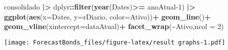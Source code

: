 \documentclass[
]{article}
\newenvironment{Shaded}{\begin{snugshade}}{\end{snugshade}}
\newcommand{\AttributeTok}[1]{\textcolor[rgb]{0.13,0.29,0.53}{#1}}
\newcommand{\DecValTok}[1]{\textcolor[rgb]{0.00,0.00,0.81}{#1}}
\newcommand{\FunctionTok}[1]{\textcolor[rgb]{0.13,0.29,0.53}{\textbf{#1}}}
\newcommand{\NormalTok}[1]{#1}
\newcommand{\SpecialCharTok}[1]{\textcolor[rgb]{0.81,0.36,0.00}{\textbf{#1}}}
\begin{document}
\begin{Shaded}
\begin{Highlighting}[]
\NormalTok{consolidado }\SpecialCharTok{|\textgreater{}}\NormalTok{ dplyr}\SpecialCharTok{::}\FunctionTok{filter}\NormalTok{(}\FunctionTok{year}\NormalTok{(Dates)}\SpecialCharTok{\textgreater{}=}\NormalTok{ anoAtual}\DecValTok{{-}1}\NormalTok{) }\SpecialCharTok{|\textgreater{}} 
               \FunctionTok{ggplot}\NormalTok{(}\FunctionTok{aes}\NormalTok{(}\AttributeTok{x=}\NormalTok{Dates, }\AttributeTok{y=}\NormalTok{rDiario, }\AttributeTok{color=}\NormalTok{Ativo))}\SpecialCharTok{+}
               \FunctionTok{geom\_line}\NormalTok{()}\SpecialCharTok{+}
               \FunctionTok{geom\_vline}\NormalTok{(}\AttributeTok{xintercept=}\NormalTok{dataAtual)}\SpecialCharTok{+}
               \FunctionTok{facet\_wrap}\NormalTok{(}\SpecialCharTok{\textasciitilde{}}\NormalTok{Ativo,}\AttributeTok{ncol =} \DecValTok{2}\NormalTok{)}
\end{Highlighting}
\end{Shaded}

\texttt{[image: ForecastBonds\_files/figure-latex/result graphs-1.pdf]}
\end{document}
